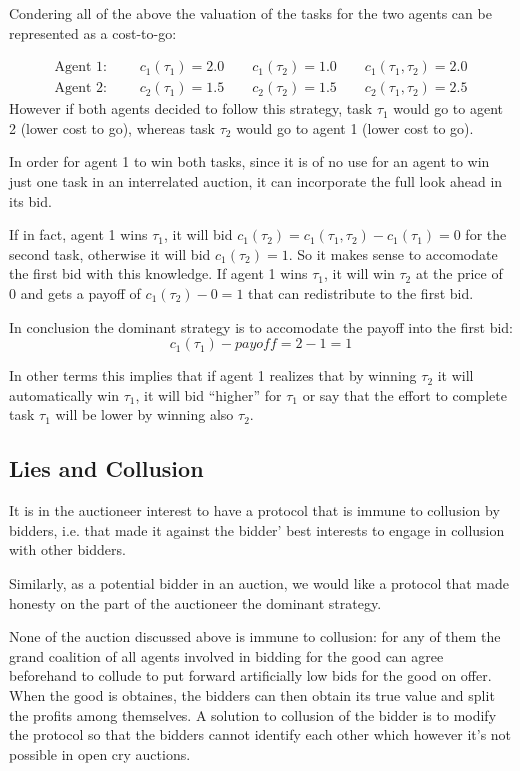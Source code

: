 Condering all of the above the valuation of the tasks for the two agents can be represented as a cost-to-go:

\begin{gather*}
\text{Agent 1: }\qquad c_1(\tau_1) =2.0 \qquad c_1(\tau_2) =1.0 \qquad c_1(\tau_1, \tau_2) =2.0\\
\text{Agent 2: }\qquad c_2(\tau_1) = 1.5  \qquad c_2(\tau_2) = 1.5 \qquad c_2(\tau_1, \tau_2) =2.5 
\end{gather*}
However if both agents decided to follow this strategy, task $\tau_1$ would go to agent 2 (lower cost to go), whereas task $\tau_2$ would go to agent 1 (lower cost to go).

In order for agent 1 to win both tasks, since it is of no use for an agent to win just one task in an interrelated auction, it can incorporate the full look ahead in its bid.

If in fact, agent 1 wins $\tau_1$, it will bid $c_1(\tau_2) = c_1(\tau_1, \tau_2) - c_1(\tau_1) = 0$ for the second task, otherwise it will bid $c_1(\tau_2) = 1$.
So it makes sense to accomodate the first bid with this knowledge.
If agent 1 wins $\tau_1$, it will win $\tau_2$ at the price of 0 and gets a payoff of $c_1(\tau_2) - 0 = 1$ that can redistribute to the first bid.

In conclusion the dominant strategy is to accomodate the payoff into the first bid:
\[c_1(\tau_1) -payoff = 2-1=1\]

In other terms this implies that if agent 1 realizes that by winning $\tau_2$ it will automatically win $\tau_1$, it will bid ``higher'' for $\tau_1$ or say that the effort to complete task $\tau_1$ will be lower by winning also  $\tau_2$. 

\subsection{Lies and Collusion}
It is in the auctioneer interest to have a protocol that is immune to collusion by bidders, i.e. that made it against the bidder' best interests to engage in collusion with other bidders.

Similarly, as a potential bidder in an auction, we would like a protocol that made honesty on the part of the auctioneer the dominant strategy.

None of the auction discussed above is immune to collusion: for any of them the grand coalition of all agents involved in bidding for the good can agree beforehand to collude to put forward artificially low bids for the good on offer.\\
When the good is obtaines, the bidders can then obtain its true value and split the profits among themselves.
A solution to collusion of the bidder is to modify the protocol so that the bidders cannot identify each other which however it's not possible in open cry auctions.

